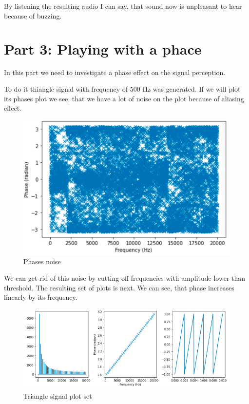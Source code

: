 \documentclass[a4paper]{article}
\begin{document}
        By listening the resulting audio I can say, that sound now is unpleasant to hear because of buzzing.
        
    \newpage
        \section{Part 3: Playing with a phace}
            
        In this part we need to investigate a phase effect on the signal perception. 
        
        To do it thiangle signal with frequency of 500 Hz was generated. If we will plot its phases plot we see, that we have a lot of noise on the plot because of aliasing effect. 
        
        \begin{figure}[H]
            \centering
            \includegraphics[width=\textwidth]{img/ph1.png}
            \caption{Phases noise}
            \label{fig:als_sqr}
        \end{figure}
        
        We can get rid of this noise by cutting off frequencies with amplitude lower than threshold. The resulting set of plots is next. We can see, that phase increases linearly by its frequency.
            
        \begin{figure}[H]
            \centering
            \includegraphics[width=\textwidth]{img/ph2.png}
            \caption{Triangle signal plot set}
            \label{fig:als_sqr}
        \end{figure}
        
\end{document}
